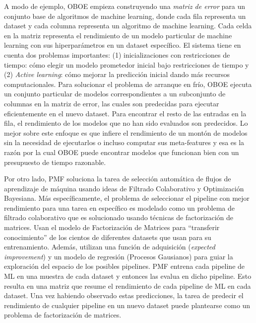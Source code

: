 A modo de ejemplo, OBOE \cite{yang2018oboe} empieza construyendo una \textit{matriz de error} para un conjunto base de algoritmos de machine learning, donde cada fila representa un dataset y cada columna representa un algoritmo de machine learning. Cada celda en la matriz representa el rendimiento de un modelo particular de machine learning con sus hiperparámetros en un dataset específico. El sistema tiene en cuenta dos problemas importantes: (1) inicializaciones con restricciones de tiempo: cómo elegir un modelo prometedor inicial bajo restricciones de tiempo y (2) \textit{Active learning}: cómo mejorar la predicción inicial dando más recursos computacionales. Para solucionar el problema de arranque en frío, OBOE ejecuta un conjunto particular de modelos correspondientes a un subconjunto de columnas en la matriz de error, las cuales son predecidas para ejecutar eficientemente en el nuevo dataset. Para encontrar el resto de las entradas en la fila, el rendimiento de los modelos que no han sido evaluados son predecidos. Lo mejor sobre este enfoque es que infiere el rendimiento de un montón de modelos sin la necesidad de ejecutarlos o incluso computar sus meta-features  y esa es la razón por la cual OBOE puede encontrar modelos que funcionan bien con un presupuesto de tiempo razonable.

Por otro lado, PMF \cite{fusi2018advances} soluciona la tarea de selección automática de flujos de aprendizaje de máquina usando ideas de Filtrado Colaborativo y Optimización Bayesiana. Más específicamente, el problema de seleccionar el pipeline con mejor rendimiento para una tarea en específico es modelado como un problema de filtrado colaborativo que es solucionado usando técnicas de factorización de matrices. Usan el modelo de Factorización de Matrices para ``transferir conocimiento'' de los cientos de diferentes datasets que usan para su entrenamiento. Además, utilizan una función de adquisición (\textit{expected improvement}) y un modelo de regresión (Procesos Gausianos) para guiar la exploración del espacio de los posibles pipelines. PMF entrena cada pipeline de ML en una muestra de cada dataset y entonces las evalua en dicho pipeline. Esto resulta en una matriz que resume el rendimiento de cada pipeline de ML en cada dataset. Una vez habiendo observado estas predicciones, la tarea de predecir el rendimiento de cualquier pipeline en un nuevo dataset puede plantearse como un problema de factorización de matrices.

